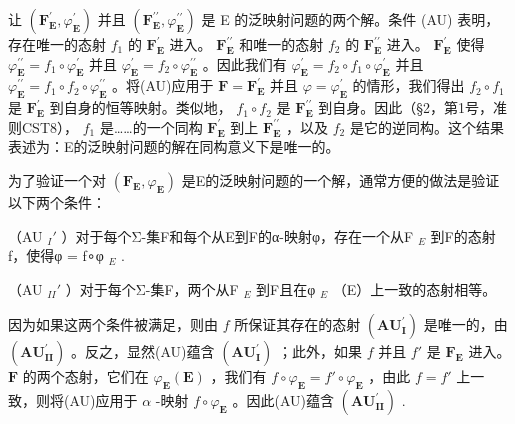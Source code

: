 让 \((\mathbf{F}_{\mathbf{E}}^{\prime},\varphi_{\mathbf{E}}^{\prime})\) 并且 \((\mathbf{F}_{\mathbf{E}}^{\prime \prime},\varphi_{\mathbf{E}}^{\prime \prime})\) 是 E 的泛映射问题的两个解。条件 (AU) 表明，存在唯一的态射 \(f_{1}\) 的 \(\mathbf{F}_{\mathbf{E}}^{\prime}\) 进入。 \(\mathbf{F}_{\mathbf{E}}^{\prime \prime}\) 和唯一的态射 \(f_{2}\) 的 \(\mathbf{F}_{\mathbf{E}}^{\prime \prime}\) 进入。 \(\mathbf{F}_{\mathbf{E}}^{\prime}\) 使得 \(\varphi_{\mathbf{E}}^{\prime \prime} = f_{1}\circ \varphi_{\mathbf{E}}^{\prime}\) 并且 \(\varphi_{\mathbf{E}}^{\prime} = f_{2}\circ \varphi_{\mathbf{E}}^{\prime \prime}\) 。因此我们有 \(\varphi_{\mathbf{E}}^{\prime} = f_{2}\circ f_{1}\circ \varphi_{\mathbf{E}}^{\prime}\) 并且 \(\varphi_{\mathbf{E}}^{\prime \prime} = f_{1}\circ f_{2}\circ \varphi_{\mathbf{E}}^{\prime \prime}\) 。将(AU)应用于 \(\mathbf{F} = \mathbf{F}_{\mathbf{E}}^{\prime}\) 并且 \(\varphi = \varphi_{\mathbf{E}}^{\prime}\) 的情形，我们得出 \(f_{2}\circ f_{1}\) 是 \(\mathbf{F}_{\mathbf{E}}^{\prime}\) 到自身的恒等映射。类似地， \(f_{1}\circ f_{2}\) 是 \(\mathbf{F}_{\mathbf{E}}^{\prime \prime}\) 到自身。因此（§2，第1号，准则CST8）， \(f_{1}\) 是……的一个同构 \(\mathbf{F}_{\mathbf{E}}^{\prime}\) 到上 \(\mathbf{F}_{\mathbf{E}}^{\prime \prime}\) ，以及 \(f_{2}\) 是它的逆同构。这个结果表述为：E的泛映射问题的解在同构意义下是唯一的。

为了验证一个对 \((\mathbf{F}_{\mathbf{E}}, \varphi_{\mathbf{E}})\) 是E的泛映射问题的一个解，通常方便的做法是验证以下两个条件：

（AU \(_{I}'\) ）对于每个Σ-集F和每个从E到F的α-映射φ，存在一个从F \(_{E}\) 到F的态射f，使得φ = f∘φ \(_{E}\) .

（AU \(_{II}'\) ）对于每个Σ-集F，两个从F \(_{E}\) 到F且在φ \(_{E}\) （E）上一致的态射相等。

因为如果这两个条件被满足，则由 \(f\) 所保证其存在的态射 \((\mathbf{AU}_{\mathbf{I}}^{\prime})\) 是唯一的，由 \((\mathbf{AU}_{\mathbf{II}}^{\prime})\) 。反之，显然(AU)蕴含 \((\mathbf{AU}_{\mathbf{I}}^{\prime})\) ；此外，如果 \(f\) 并且 \(f'\) 是 \(\mathbf{F}_{\mathbf{E}}\) 进入。 \(\mathbf{F}\) 的两个态射，它们在 \(\varphi_{\mathbf{E}}(\mathbf{E})\) ，我们有 \(f \circ \varphi_{\mathbf{E}} = f' \circ \varphi_{\mathbf{E}}\) ，由此 \(f = f'\) 上一致，则将(AU)应用于 \(\alpha\) -映射 \(f \circ \varphi_{\mathbf{E}}\) 。因此(AU)蕴含 \((\mathbf{AU}_{\mathbf{II}}^{\prime})\) .

